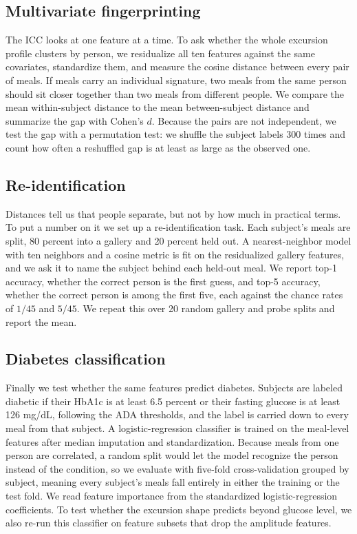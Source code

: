 \documentclass[10pt,conference,compsoc]{IEEEtran}
\begin{document}
\subsection{Multivariate fingerprinting}
The ICC looks at one feature at a time. To ask whether the whole excursion profile
clusters by person, we residualize all ten features against the same covariates,
standardize them, and measure the cosine distance between every pair of meals. If
meals carry an individual signature, two meals from the same person should sit
closer together than two meals from different people. We compare the mean
within-subject distance to the mean between-subject distance and summarize the gap
with Cohen's $d$. Because the pairs are not independent, we test the gap with a
permutation test: we shuffle the subject labels 300 times and count how often a
reshuffled gap is at least as large as the observed one.

\subsection{Re-identification}
Distances tell us that people separate, but not by how much in practical terms. To
put a number on it we set up a re-identification task. Each subject's meals are
split, 80 percent into a gallery and 20 percent held out. A nearest-neighbor
model with ten neighbors and a cosine metric is fit on the residualized gallery
features, and we ask it to name the subject behind each held-out meal. We report
top-1 accuracy, whether the correct person is the first guess, and top-5 accuracy,
whether the correct person is among the first five, each against the chance rates
of $1/45$ and $5/45$. We repeat this over 20 random gallery and probe splits and
report the mean.

\subsection{Diabetes classification}
Finally we test whether the same features predict diabetes. Subjects are labeled
diabetic if their HbA1c is at least 6.5 percent or their fasting glucose is at
least 126 mg/dL, following the ADA thresholds, and the label is carried down to
every meal from that subject. A logistic-regression classifier is trained on the
meal-level features after median imputation and standardization. Because meals
from one person are correlated, a random split would let the model recognize the
person instead of the condition, so we evaluate with five-fold cross-validation
grouped by subject, meaning every subject's meals fall entirely in either the
training or the test fold. We read feature importance from the standardized
logistic-regression coefficients. To test whether the excursion shape predicts
beyond glucose level, we also re-run this classifier on feature subsets that drop
the amplitude features.
\end{document}
